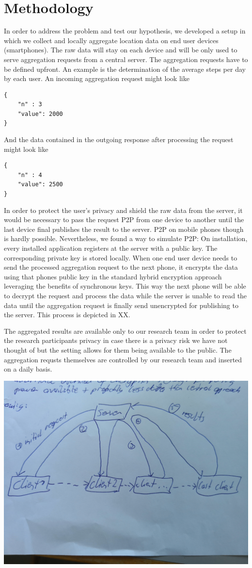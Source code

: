 \chapter{Methodology}\label{chapter:method}

In order to address the problem and test our hypothesis, we developed a setup in which we collect and locally aggregate location data on end user devices (smartphones). The raw data will stay on each device and will be only used to serve aggregation requests from a central server. The aggregation requests have to be defined upfront. An example is the determination of the average steps per day by each user. An incoming aggregation request might look like
\begin{verbatim}
{
	"n" : 3
	"value": 2000
}
\end{verbatim}
And the data contained in the outgoing response after processing the request might look like
\begin{verbatim}
{
	"n" : 4
	"value": 2500
}
\end{verbatim}
 In order to protect the user's privacy and shield the raw data from the server, it would be necessary to pass the request P2P from one device to another until the last device final publishes the result to the server. P2P on mobile phones though is hardly possible. Nevertheless, we found a way to simulate P2P: On installation, every installed application registers at the server with a public key. The corresponding private key is stored locally. When one end user device needs to send the processed aggregation request to the next phone, it encrypts the data using that phones public key in the standard hybrid encryption approach leveraging the benefits of synchronous keys. This way the next phone will be able to decrypt the request and process the data while the server is unable to read the data until the aggregation request is finally send unencrypted for publishing to the server. This process is depicted in XX.

 The aggregated results are available only to our research team in order to protect the research participants privacy in case there is a privacy risk we have not thought of but the setting allows for them being available to the public. The aggregation requsts themselves are controlled by our research team and inserted on a daily basis.

\includegraphics[width=\textwidth]{data/concept.jpg}

